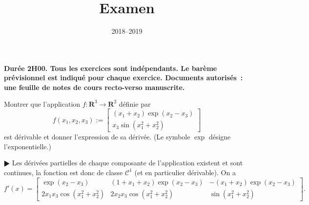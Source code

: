 \documentclass[11pt,a4paper]{article}
\title{Examen}
\date{2018--2019}
\def\R{\mathbf{R}}
\def\CC{\mathscr{C}}
\theoremstyle{plain}
\theoremstyle{definition}
\begin{document}
\maketitle

{\bf Dur\'ee 2H00. Tous les exercices sont ind\'ependants.
Le bar\`eme pr\'e\-vi\-sion\-nel est indiqu\'e pour chaque exercice.
Documents autoris\'es~: une feuille de notes de cours recto-verso manuscrite.}

\begin{Exercice}[4 points]
Montrer que l'application $f : \R^3 \to \R^2$ d\'efinie par
\[ f(x_1,x_2,x_3) := \left[ \begin{array}{c}
  (x_1+x_2)\exp(x_2-x_3)\\
  x_3\sin(x_1^2+x_2^2)
  \end{array} \right] \]
est d\'erivable et donner l'expression de sa d\'eriv\'ee. (Le symbole $\exp$
d\'esigne l'exponentielle.)

\begin{corr} $\RHD$ Les d\'eriv\'ees partielles de chaque composante de l'application
existent et sont continues, la fonction est donc de classe $\CC^1$ (et en particulier
d\'erivable). On a
\[ f'(x) = \left[ \begin{array}{ccc}
  \exp(x_2-x_3) & (1+x_1+x_2)\exp(x_2-x_3) & -(x_1+x_2)\exp(x_2-x_3)\\
  2x_1x_3\cos(x_1^2+x_2^2) & 2x_2x_3\cos(x_1^2+x_2^2) & \sin(x_1^2+x_2^2)
  \end{array} \right]. \]
\end{corr}
\end{Exercice} \vspace*{1em}
\end{document}
